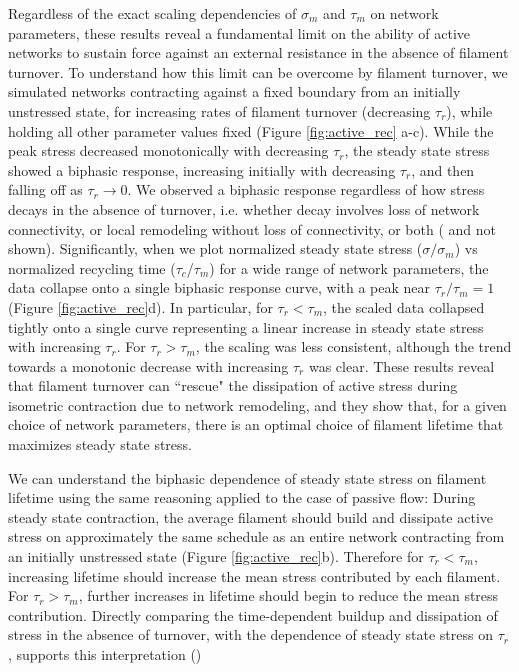 \documentclass[10pt,letterpaper]{article}
\begin{document}
Regardless of the exact scaling dependencies of $\sigma_m$ and $\tau_m$ on network parameters, these results reveal a fundamental limit on the ability of active networks to sustain force against an external resistance in the absence of filament turnover.  To understand how this limit can be overcome by filament turnover, we simulated networks contracting against a fixed boundary from an initially unstressed state, for increasing rates of filament turnover (decreasing $\tau_r$), while holding all other parameter values fixed (Figure \ref{fig:active_rec} a-c). While the peak stress decreased monotonically with decreasing $\tau_r$, the steady state stress showed a biphasic response, increasing initially with decreasing $\tau_r$, and then falling off as $\tau_r \to 0$.  We observed a biphasic response regardless of how stress decays in the absence of turnover, i.e. whether decay involves loss of network connectivity, or local remodeling without loss of connectivity, or both ( and not shown). Significantly, when we plot normalized steady state stress ($\sigma/\sigma_m$) vs normalized recycling time ($\tau_c$/$\tau_m$) for a wide range of network parameters, the data collapse onto a single biphasic response curve, with a peak near $\tau_r/\tau_m = 1$ (Figure \ref{fig:active_rec}d). In particular, for $\tau_r < \tau_m$, the scaled data collapsed tightly onto a single curve representing a linear increase in steady state stress with increasing $\tau_r$. For $\tau_r > \tau_m$, the scaling was less consistent, although the trend towards a monotonic decrease with increasing $\tau_r$ was clear. These results reveal that filament turnover can ``rescue" the dissipation of active stress during isometric contraction due to network remodeling, and they show that, for a given choice of network parameters, there is an optimal choice of filament lifetime that maximizes steady state stress.

We can understand the biphasic dependence of steady state stress on filament lifetime using the same reasoning applied to the case of passive flow:   During steady state contraction, the average filament should build and dissipate active stress on approximately the same schedule as an entire network contracting from an initially unstressed state (Figure \ref{fig:active_rec}b). Therefore for $\tau_r < \tau_m$, increasing lifetime should increase the mean stress contributed by each filament. For $\tau_r > \tau_m$, further increases in lifetime should begin to reduce the mean stress contribution. Directly comparing the time-dependent buildup and dissipation of stress in the absence of turnover, with the dependence of steady state stress on $\tau_r$, supports this interpretation ()  
\end{document}
